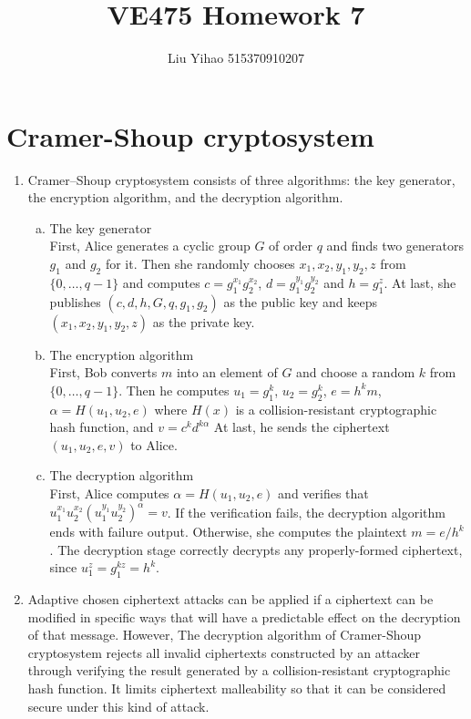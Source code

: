 \documentclass{article}
\title{VE475 Homework 7}
\author{Liu Yihao 515370910207}
\date{}
\begin{document}
\maketitle

\section{Cramer-Shoup cryptosystem}
\begin{enumerate}
\item
Cramer–Shoup cryptosystem consists of three algorithms: the key generator, the encryption algorithm, and the decryption algorithm.
\begin{enumerate}[a)]
\item The key generator \\
First, Alice generates a cyclic group $G$ of order $q$ and finds two generators $g_1$ and $g_2$ for it. Then she randomly chooses $x_1,x_2,y_1,y_2,z$ from $\{0,\dots,q-1\}$ and computes $c=g_1^{x_1}g_2^{x_2}$, $d=g_1^{y_1}g_2^{y_2}$ and $h=g_1^z$. At last, she publishes $(c,d,h,G,q,g_1,g_2)$ as the public key and keeps $(x_1,x_2,y_1,y_2,z)$ as the private key.
\item The encryption algorithm \\
First, Bob converts $m$ into an element of $G$ and choose a random $k$ from $\{0,\dots,q-1\}$. Then he computes $u_1=g_1^k$, $u_2=g_2^k$, $e=h^km$, $\alpha=H(u_1,u_2,e)$ where $H(x)$ is a collision-resistant cryptographic hash function, and $v=c^kd^{k\alpha}$ At last, he sends the ciphertext $(u_1,u_2,e,v)$ to Alice.
\item The decryption algorithm \\
First, Alice computes $\alpha=H(u_1,u_2,e)$ and verifies that $u_1^{x_1}u_2^{x_2}(u_1^{y_1}u_2^{y_2})^\alpha=v$. If the verification fails, the decryption algorithm ends with failure output. Otherwise, she computes the plaintext $m=e/h^k$. The decryption stage correctly decrypts any properly-formed ciphertext, since $u_1^z=g_1^{kz}=h^k$.
\end{enumerate}

\item
Adaptive chosen ciphertext attacks can be applied if a ciphertext can be modified in specific ways that will have a predictable effect on the decryption of that message. However, The decryption algorithm of Cramer-Shoup cryptosystem rejects all invalid ciphertexts constructed by an attacker through verifying the result generated by a collision-resistant cryptographic hash function. It limits ciphertext malleability so that it can be considered secure under this kind of attack.


\end{enumerate}
\end{document}

